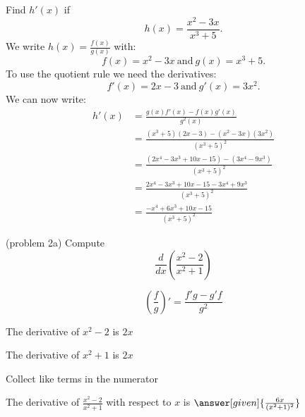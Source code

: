 \documentclass{ximera}
\begin{document}
\begin{example}[example 2]
Find $h'(x)$ if 
\[
h(x) = \frac{x^2 - 3x}{x^3 +5}.
\]
We write $\displaystyle{h(x) = \frac{f(x)}{g(x)}}$ 
with:
\[f(x) =x^2 - 3x \ \text{and} \  g(x)= x^3 + 5.\]
 To use the quotient rule we need the derivatives:
\[f'(x) = 2x-3 \ \text{and} \  g'(x) = 3x^2.\]
We can now write: 
\begin{align*}
h'(x) &= \frac{g(x)f'(x) - f(x)g'(x)}{g^2(x)}\\
&= \frac{(x^3 + 5)(2x-3) - (x^2-3x)(3x^2)}{(x^3 + 5)^2}\\
&= \frac{(2x^4 -3x^3 + 10x - 15) -(3x^4-9x^3)}{(x^3 + 5)^2}\\
&= \frac{2x^4 -3x^3 + 10x - 15 -3x^4+9x^3}{(x^3 + 5)^2}\\
&= \frac{-x^4 +6x^3 + 10x - 15}{(x^3 + 5)^2}
\end{align*}
\end{example}


\begin{center}
\begin{foldable}
\end{foldable}
\end{center}


\begin{problem}(problem 2a)
  Compute
  \[
  \frac{d}{dx} \left(\frac{x^2 - 2}{x^2 + 1}\right)
  \]
  
    \begin{hint}
      \[\left(\frac{f}{g}\right)' = \frac{f'g-g'f}{g^2}\]
    \end{hint}
    \begin{hint}
      The derivative of $x^2 - 2$ is $2x$
    \end{hint}
    \begin{hint}
      The derivative of $x^2 + 1$ is $2x$
    \end{hint}
    \begin{hint}
      Collect like terms in the numerator
    \end{hint}
		The derivative of $\frac{x^2 - 2}{x^2 + 1}$ with respect to $x$ is
		 $\answer[given]{\frac{6x}{(x^2 + 1)^2}}$
		
\end{problem}
\end{document}
